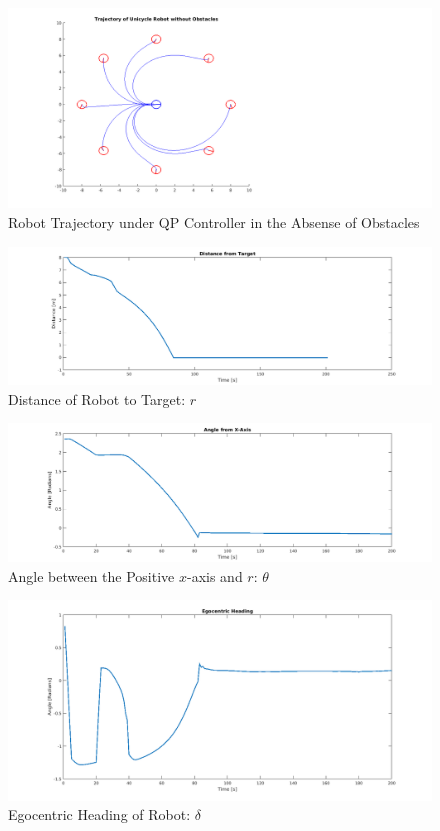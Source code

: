 \documentclass[journal]{IEEEtran}
\begin{document}
\begin{figure}[h!]
\centering
\includegraphics[scale=0.4]{octoPlotCrisisSQR.png} 
\caption{Robot Trajectory under QP Controller in the Absense of Obstacles\label{fig:octoplotsans}} 
\end{figure}

\begin{figure}[h!]
\centering
\includegraphics[scale=0.4]{distancetogo.png} 
\caption{Distance of Robot to Target: $r$\label{fig:r}} 
\end{figure}

\begin{figure}[h!]
\centering
\includegraphics[scale=0.4]{theta.png} 
\caption{Angle between the Positive $x$-axis and $r$: $\theta$\label{fig:theta}} 
\end{figure}

\begin{figure}[h!]
\centering
\includegraphics[scale=0.4]{delta.png} 
\caption{Egocentric Heading of Robot: $\delta$\label{fig:delta}} 
\end{figure}
\end{document}
